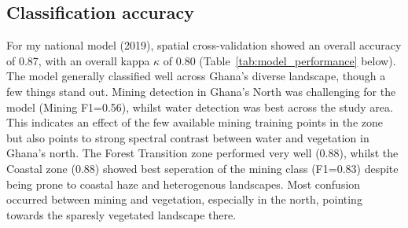 \documentclass[]{interact}
\begin{document}
\subsection{Classification accuracy}
For my national model (2019), spatial cross-validation showed an overall accuracy of 0.87, with an overall kappa {\textbf{$\kappa$}} of 0.80 (Table~\ref{tab:model_performance} below). The model generally classified well across Ghana's diverse landscape, though a few things stand out. Mining detection in Ghana's North was challenging for the model (Mining F1=0.56), whilst water detection was best across the study area. This indicates an effect of the few available mining training points in the zone but also points to strong spectral contrast between water and vegetation in Ghana's north. The Forest Transition zone performed very well (0.88), whilst the Coastal zone (0.88) showed best seperation of the mining class (F1=0.83) despite being prone to coastal haze and heterogenous landscapes. Most confusion occurred between mining and vegetation, especially in the north, pointing towards the sparesly vegetated landscape there.
\end{document}

